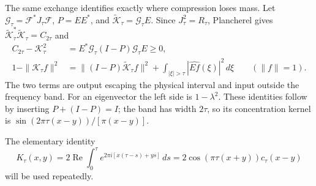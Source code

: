 The same exchange identifies exactly where compression loses mass.
Let $\mathcal G_\tau=\mathcal F^*J_\tau\mathcal F$, $P=EE^*$, and
$\widetilde{\mathcal K}_\tau=\mathcal G_\tau E$.
Since $J_\tau^2=R_\tau$, Plancherel gives
$\widetilde{\mathcal K}_\tau^*\widetilde{\mathcal K}_\tau=C_{2\tau}$ and
\begin{equation}\label{unified:eq:two-leakages}
\begin{aligned}
 C_{2\tau}-\mathcal K_\tau^2
   &=E^*\mathcal G_\tau(I-P)\mathcal G_\tau E\ge0,\\
 1-\|\mathcal K_\tau f\|^2
   &=\|(I-P)\widetilde{\mathcal K}_\tau f\|^2
      +\int_{|\xi|>\tau}|\widehat{Ef}(\xi)|^2\,d\xi
      \qquad(\|f\|=1).
\end{aligned}
\end{equation}
The two terms are output escaping the physical interval and input outside
the frequency band. For an eigenvector the left side is $1-\lambda^2$.
These identities follow by inserting $P+(I-P)=I$; the band has width
$2\tau$, so its concentration kernel is $\sin(2\pi\tau(x-y))/[\pi(x-y)]$.

The elementary identity
\begin{equation}\label{eq:2.4}
 K_\tau(x,y)=2\operatorname{Re}\int_0^\tau
 e^{2\pi i[x(\tau-s)+ys]}\,ds
 =2\cos(\pi\tau(x+y))c_\tau(x-y)
\end{equation}
will be used repeatedly.

